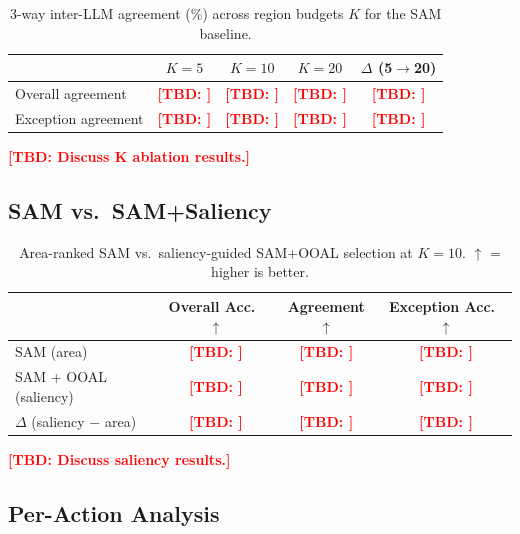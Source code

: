 \documentclass[runningheads]{llncs}
\newcommand{\TBD}[1]{\textcolor{red}{\textbf{[TBD: #1]}}}
\begin{document}
\begin{table}[t]
  \centering
  \caption{3-way inter-LLM agreement (\%) across region budgets $K$
    for the SAM baseline.}
  \label{tab:k_ablation}
  \begin{tabular}{lcccc}
    \toprule
    & $K=5$ & $K=10$ & $K=20$ & $\Delta$ (5$\to$20) \\
    \midrule
    Overall agreement   & \TBD{} & \TBD{} & \TBD{} & \TBD{} \\
    Exception agreement & \TBD{} & \TBD{} & \TBD{} & \TBD{} \\
    \bottomrule
  \end{tabular}
\end{table}

\TBD{Discuss K ablation results.}

\subsection{SAM vs.\ SAM+Saliency}
\label{sec:saliency}

\begin{table}[t]
  \centering
  \caption{Area-ranked SAM vs.\ saliency-guided SAM+OOAL selection
    at $K=10$. $\uparrow$ = higher is better.}
  \label{tab:saliency}
  \begin{tabular}{lccc}
    \toprule
    & Overall Acc.\ $\uparrow$ & Agreement $\uparrow$ & Exception Acc.\ $\uparrow$ \\
    \midrule
    SAM (area)           & \TBD{} & \TBD{} & \TBD{} \\
    SAM + OOAL (saliency) & \TBD{} & \TBD{} & \TBD{} \\
    \midrule
    $\Delta$ (saliency $-$ area) & \TBD{} & \TBD{} & \TBD{} \\
    \bottomrule
  \end{tabular}
\end{table}

\TBD{Discuss saliency results.}

\subsection{Per-Action Analysis}
\label{sec:per_action}
\end{document}
